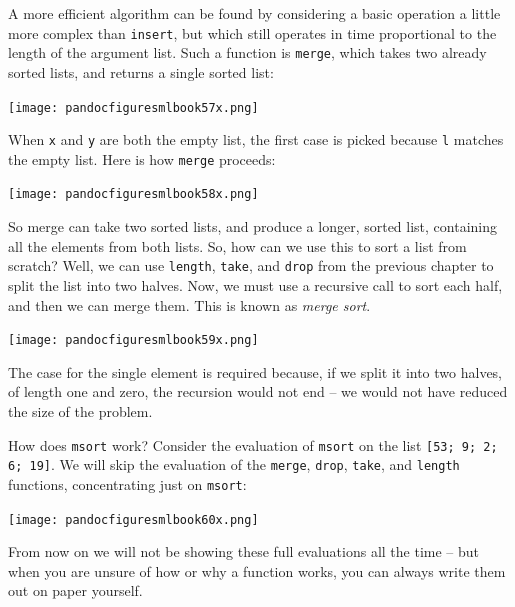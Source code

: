 \documentclass[]{book}
\begin{document}
A more efficient algorithm can be found by considering a basic operation a little more complex than \texttt{insert}, but which still operates in time proportional to the length of the argument list. Such a function is \texttt{merge}, which takes two already sorted lists, and returns a single sorted list:

\medskip
\begin{center}
\noindent\texttt{[image: pandocfiguresmlbook57x.png]}
\end{center}
\medskip

\noindent When \texttt{x} and \texttt{y} are both the empty list, the first case is picked because \texttt{l} matches the empty list. Here is how \texttt{merge} proceeds:

\medskip
\begin{center}
\noindent\texttt{[image: pandocfiguresmlbook58x.png]}
\end{center}
\medskip

\noindent So merge can take two sorted lists, and produce a longer, sorted list, containing all the elements from both lists. So, how can we use this to sort a list from scratch? Well, we can use \texttt{length}, \texttt{take}, and \texttt{drop} from the previous chapter to split the list into two halves. Now, we must use a recursive call to sort each half, and then we can merge them. This is known as \textit{merge sort}.

\medskip
\begin{center}
\noindent\texttt{[image: pandocfiguresmlbook59x.png]}
\end{center}
\medskip

\noindent The case for the single element is required because, if we split it into two halves, of length one and zero, the recursion would not end -- we would not have reduced the size of the problem.

How does \texttt{msort} work? Consider the evaluation of \texttt{msort} on the list \texttt{[53; 9; 2; 6; 19]}. We will skip the evaluation of the \texttt{merge}, \texttt{drop}, \texttt{take}, and \texttt{length} functions, concentrating just on \texttt{msort}:

\medskip
\begin{center}
\noindent\texttt{[image: pandocfiguresmlbook60x.png]}
\end{center}
\medskip

\noindent From now on we will not be showing these full evaluations all the time -- but when you are unsure of how or why a function works, you can always write them out on paper yourself.
\end{document}
